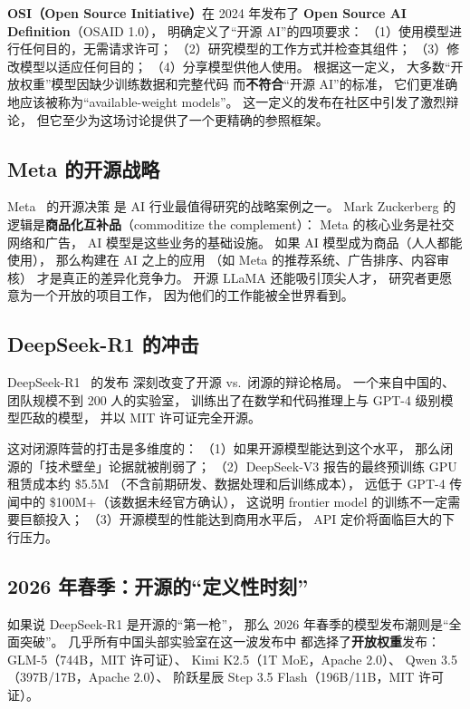 \textbf{OSI（Open Source Initiative）}在 2024 年发布了
\textbf{Open Source AI Definition}（OSAID 1.0），
明确定义了“开源 AI”的四项要求：
（1）使用模型进行任何目的，无需请求许可；
（2）研究模型的工作方式并检查其组件；
（3）修改模型以适应任何目的；
（4）分享模型供他人使用。
根据这一定义，
大多数“开放权重”模型因缺少训练数据和完整代码
而\textbf{不符合}“开源 AI”的标准，
它们更准确地应该被称为“available-weight models”。
这一定义的发布在社区中引发了激烈辩论，
但它至少为这场讨论提供了一个更精确的参照框架。

\subsection{Meta 的开源战略}

Meta~\cite{touvron2023llama,dubey2024llama3} 的开源决策
是 AI 行业最值得研究的战略案例之一。
Mark Zuckerberg 的逻辑是\textbf{商品化互补品}（commoditize the complement）：
Meta 的核心业务是社交网络和广告，
AI 模型是这些业务的基础设施。
如果 AI 模型成为商品（人人都能使用），
那么构建在 AI 之上的应用
（如 Meta 的推荐系统、广告排序、内容审核）
才是真正的差异化竞争力。
开源 LLaMA 还能吸引顶尖人才，
研究者更愿意为一个开放的项目工作，
因为他们的工作能被全世界看到。

\subsection{DeepSeek-R1 的冲击}

DeepSeek-R1~\cite{deepseekr1} 的发布
深刻改变了开源 vs.\ 闭源的辩论格局。
一个来自中国的、团队规模不到 200 人的实验室，
训练出了在数学和代码推理上与 GPT-4 级别模型匹敌的模型，
并以 MIT 许可证完全开源。

这对闭源阵营的打击是多维度的：
（1）如果开源模型能达到这个水平，
那么闭源的「技术壁垒」论据就被削弱了；
（2）DeepSeek-V3 报告的最终预训练 GPU 租赁成本约 \$5.5M
（不含前期研发、数据处理和后训练成本），
远低于 GPT-4 传闻中的 \$100M+（该数据未经官方确认），
这说明 frontier model 的训练不一定需要巨额投入；
（3）开源模型的性能达到商用水平后，
API 定价将面临巨大的下行压力。

\subsection{2026 年春季：开源的“定义性时刻”}

如果说 DeepSeek-R1 是开源的“第一枪”，
那么 2026 年春季的模型发布潮则是“全面突破”。
几乎所有中国头部实验室在这一波发布中
都选择了\textbf{开放权重}发布：
GLM-5（744B，MIT 许可证）、
Kimi K2.5（1T MoE，Apache 2.0）、
Qwen 3.5（397B/17B，Apache 2.0）、
阶跃星辰 Step 3.5 Flash（196B/11B，MIT 许可证）。


